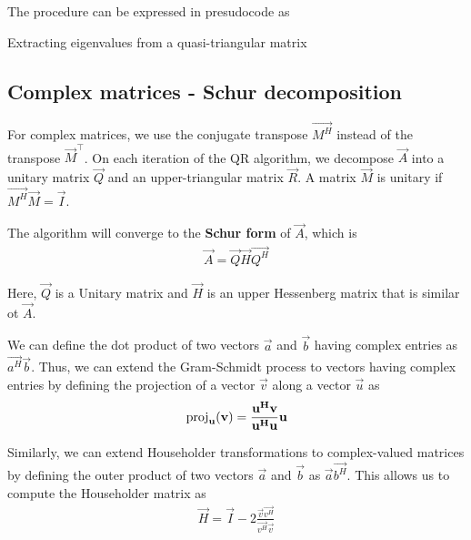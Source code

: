 \documentclass{article}
\begin{document}
The procedure can be expressed in presudocode as

\begin{algorithm}
    \caption{Extracting eigenvalues from a quasi-triangular matrix}
\end{algorithm}

\subsection{Complex matrices - Schur decomposition}

For complex matrices, we use the conjugate transpose $\vec{M^H}$
instead of the transpose $\vec{M}^\top$. On each iteration of the 
QR algorithm, we decompose $\vec{A}$ into a unitary matrix $\vec{Q}$
and an upper-triangular matrix $\vec{R}$. A matrix $\vec{M}$ is
unitary if $\vec{M^H}\vec{M} = \vec{I}$.  

The algorithm will converge to the \textbf{Schur form} of $\vec{A}$,
which is
\begin{align}
    \vec{A} = \vec{Q}\vec{H}\vec{Q^H}
\end{align}

Here, $\vec{Q}$ is a Unitary matrix and $\vec{H}$ is an upper Hessenberg
matrix that is similar ot $\vec{A}$.

We can define the dot product of two vectors $\vec{a}$ and $\vec{b}$
having complex entries as $\vec{a^H}\vec{b}$. Thus, we can extend the
Gram-Schmidt process to vectors having complex entries by defining
the projection of a vector $\vec{v}$ along a vector $\vec{u}$ as
\begin{align}
    \operatorname{proj}_{\mathbf{u}}(\mathbf{v}) = \frac{\mathbf{u^H}\mathbf{v}}{\mathbf{u^H}\mathbf{u}} \mathbf{u}
\end{align}

Similarly, we can extend Householder transformations to complex-valued 
matrices by defining the outer product of two vectors $\vec{a}$ and $\vec{b}$
as $\vec{a}\vec{b^H}$. This allows us to compute the Householder matrix
as
\begin{align}
    \vec{H} = \vec{I} - 2\frac{\vec{v}\vec{v^H}}{\vec{v^H}\vec{v}}
\end{align}
\end{document}
